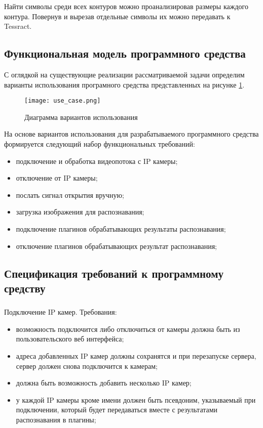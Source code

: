 Найти символы среди всех контуров можно проанализировав размеры каждого контура. Повернув и вырезав отдельные символы их можно передавать к Tessract. 

\subsection{Функциональная модель программного средства}
\label{sec:funcreq:funcmodel}

С оглядкой на существующие реализации рассматриваемой задачи определим варианты использования програмного средства представленных на рисунке \ref{fig:funcreq:funcmodel}.

\begin{figure}[p]
\centering
    \texttt{[image: use\_case.png]}  
    \caption{Диаграмма вариантов использования}
  \label{fig:funcreq:funcmodel}
\end{figure}

На основе вариантов использования для разрабатываемого программного средства формируется следующий набор функциональных требований:
\begin{itemize}
	\item подключение и обработка видеопотока с IP камеры;
  \item отключение от IP камеры;
	\item послать сигнал открытия вручную;
	\item загрузка изображения для распознавания;
	\item подключение плагинов обрабатывающих результаты распознавания;
	\item отключение плагинов обрабатывающих результат распознавания;
\end{itemize}

\subsection{Спецификация требований к программному средству}
\label{sec:fucreq:specification}

\subsubsection{}
Подключение IP камер. Требования:
\begin{itemize}
	\item возможность подключится либо отключиться от камеры должна быть из пользовательского веб интерфейса;
	\item адреса добавленных IP камер должны сохранятся и при перезапуске сервера, сервер должен снова подключится к камерам;
	\item должна быть возможность добавить несколько IP камер;
	\item у каждой IP камеры кроме имени должен быть псевдоним, указываемый при подключении, который будет передаваться вместе с результатами распознавания в плагины;
\end{itemize}


